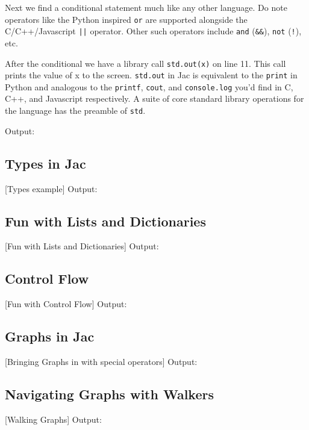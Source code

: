 \par
Next we find a conditional statement much like any other language. Do note operators like the Python inspired \texttt{or} are supported alongside the C/C++/Javascript \texttt{||} operator. Other such operators include \texttt{and} (\texttt{\&\&}), \texttt{not} (\texttt{!}), etc.

\par
After the conditional we have a library call \texttt{std.out(x)} on line 11. This call prints the value of x to the screen. \texttt{std.out} in Jac is equivalent to the \texttt{print} in Python and analogous to the \texttt{printf}, \texttt{cout}, and \texttt{console.log} you'd find in C, C++, and Javascript respectively. A suite of core standard library operations for the language has the preamble of \texttt{std}.

Output:


\subsection{Types in Jac}
[Types example]
Output:

\subsection{Fun with Lists and Dictionaries}
[Fun with Lists and Dictionaries]
Output:

\subsection{Control Flow}
[Fun with Control Flow]
Output:

\subsection{Graphs in Jac}
[Bringing Graphs in with special operators]
Output:

\subsection{Navigating Graphs with Walkers}
[Walking Graphs]
Output:


